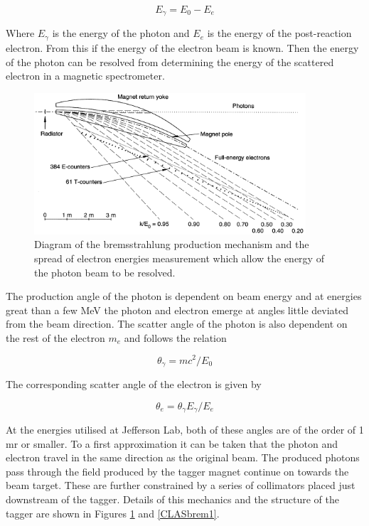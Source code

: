 \begin{equation}
E_{\gamma} = E_{0} - E_{e}
\end{equation}


Where $E_{\gamma}$ is the energy of the photon and $E_{e}$ is the energy of the post-reaction electron. From this if the energy of the electron beam is known. Then the energy of the photon can be resolved from determining the energy of the scattered electron in a magnetic spectrometer. \cite{sober2000bremsstrahlung}

\begin{figure}
	\centering
	\includegraphics[width=0.9\textwidth]{ImgChap1/Brem1improved}
	\caption{Diagram of the bremsstrahlung production mechanism and the spread of electron energies measurement which allow the energy of the photon beam to be resolved. \cite{sober2000bremsstrahlung}}
	\label{CLASbrem}
\end{figure}

The production angle of the photon is dependent on beam energy and at energies great than a few MeV the photon and electron emerge at angles little deviated from the beam direction. The scatter angle of the photon is also dependent on the rest of the electron $m_{e}$ and follows the relation

\begin{equation}
\theta_{\gamma} = mc^{2} / E_{0}
\end{equation}


The corresponding scatter angle of the electron is given by

\begin{equation}
\theta_{e} = \theta_{\gamma}E_{\gamma} / E_{e}
\end{equation}

At the energies utilised at Jefferson Lab, both of these angles are of the order of 1 mr or smaller. To a first approximation it can be taken that the photon and electron travel in the same direction as the original beam. The produced photons pass through the field produced by the tagger magnet continue on towards the beam target. These are further constrained by a series of collimators placed just downstream of the tagger. Details of this mechanics and the structure of the tagger are shown in Figures \ref{CLASbrem} and \ref{CLASbrem1}.

